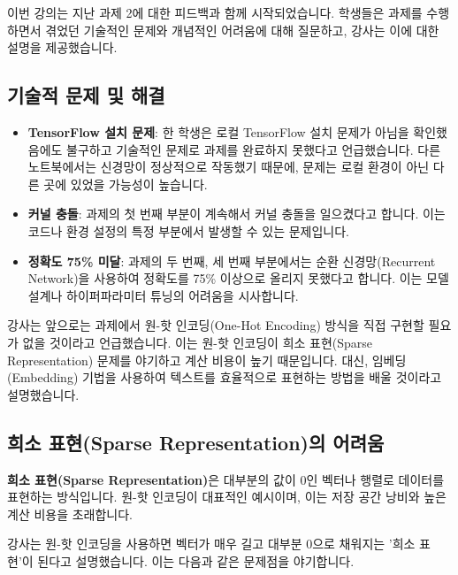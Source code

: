 \documentclass[11pt,a4paper]{article}
\theoremstyle{definition}
\begin{document}
이번 강의는 지난 과제 2에 대한 피드백과 함께 시작되었습니다. 학생들은 과제를 수행하면서 겪었던 기술적인 문제와 개념적인 어려움에 대해 질문하고, 강사는 이에 대한 설명을 제공했습니다.

\subsection{기술적 문제 및 해결}

\begin{itemize}
    \item \textbf{TensorFlow 설치 문제}: 한 학생은 로컬 TensorFlow 설치 문제가 아님을 확인했음에도 불구하고 기술적인 문제로 과제를 완료하지 못했다고 언급했습니다. 다른 노트북에서는 신경망이 정상적으로 작동했기 때문에, 문제는 로컬 환경이 아닌 다른 곳에 있었을 가능성이 높습니다.
    \item \textbf{커널 충돌}: 과제의 첫 번째 부분이 계속해서 커널 충돌을 일으켰다고 합니다. 이는 코드나 환경 설정의 특정 부분에서 발생할 수 있는 문제입니다.
    \item \textbf{정확도 75\% 미달}: 과제의 두 번째, 세 번째 부분에서는 순환 신경망(Recurrent Network)을 사용하여 정확도를 75\% 이상으로 올리지 못했다고 합니다. 이는 모델 설계나 하이퍼파라미터 튜닝의 어려움을 시사합니다.
\end{itemize}

\begin{tcolorbox}[summarybox, title=\textbf{요약}]
강사는 앞으로는 과제에서 원-핫 인코딩(One-Hot Encoding) 방식을 직접 구현할 필요가 없을 것이라고 언급했습니다. 이는 원-핫 인코딩이 희소 표현(Sparse Representation) 문제를 야기하고 계산 비용이 높기 때문입니다. 대신, 임베딩(Embedding) 기법을 사용하여 텍스트를 효율적으로 표현하는 방법을 배울 것이라고 설명했습니다.
\end{tcolorbox}

\subsection{희소 표현(Sparse Representation)의 어려움}

\begin{tcolorbox}[conceptbox, title=\textbf{핵심 개념}]
\textbf{희소 표현(Sparse Representation)}은 대부분의 값이 0인 벡터나 행렬로 데이터를 표현하는 방식입니다. 원-핫 인코딩이 대표적인 예시이며, 이는 저장 공간 낭비와 높은 계산 비용을 초래합니다.
\end{tcolorbox}

강사는 원-핫 인코딩을 사용하면 벡터가 매우 길고 대부분 0으로 채워지는 '희소 표현'이 된다고 설명했습니다. 이는 다음과 같은 문제점을 야기합니다.
\end{document}
